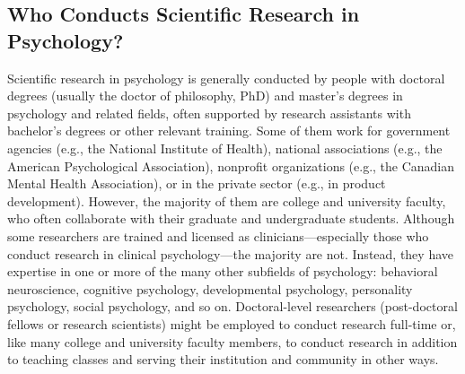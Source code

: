 \subsection{Who Conducts Scientific Research in Psychology?}


Scientific research in psychology is generally conducted by people with doctoral degrees (usually the doctor of philosophy, PhD) and master's degrees in psychology and related fields, often supported by research assistants with bachelor's degrees or other relevant training. Some of them work for government agencies (e.g., the National Institute of Health), national associations (e.g., the American Psychological Association), nonprofit organizations (e.g., the Canadian Mental Health Association), or in the private sector (e.g., in product development). However, the majority of them are college and university faculty, who often collaborate with their graduate and undergraduate students. Although some researchers are trained and licensed as clinicians---especially those who conduct research in clinical psychology---the majority are not. Instead, they have expertise in one or more of the many other subfields of psychology: behavioral neuroscience, cognitive psychology, developmental psychology, personality psychology, social psychology, and so on. Doctoral-level researchers (post-doctoral fellows or research scientists) might be employed to conduct research full-time or, like many college and university faculty members, to conduct research in addition to teaching classes and serving their institution and community in other ways.

